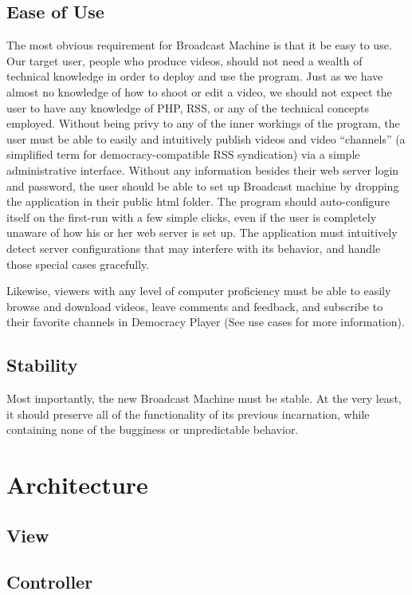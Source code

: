 \documentclass[a4paper,12pt]{report}
\begin{document}
\section{Ease of Use}

	The most obvious requirement for Broadcast Machine is that it be easy to use. Our target user, people who produce videos, should not need a wealth of technical knowledge in order to deploy and use the program. Just as we have almost no knowledge of how to shoot or edit a video, we should not expect the user to have any knowledge of PHP, RSS, or any of the technical concepts employed. Without being privy to any of the inner workings of the program, the user must be able to easily and intuitively publish videos and video “channels” (a simplified term for democracy-compatible RSS syndication) via a simple administrative interface. Without any information besides their web server login and password, the user should be able to set up Broadcast machine by dropping the application in their public html folder. The program should auto-configure itself on the first-run with a few simple clicks, even if the user is completely unaware of how his or her web server is set up. The application must intuitively detect server configurations that may interfere with its behavior, and handle those special cases gracefully.

Likewise, viewers with any level of computer proficiency must be able to easily browse and download videos, leave comments and feedback, and subscribe to their favorite channels in Democracy Player (See use cases for more information).

\section{Stability}

	Most importantly, the new Broadcast Machine must be stable. At the very least, it should preserve all of the functionality of its previous incarnation, while containing none of the bugginess or unpredictable behavior. 

\chapter{Architecture}

\section{View}

\section{Controller}
\end{document}
